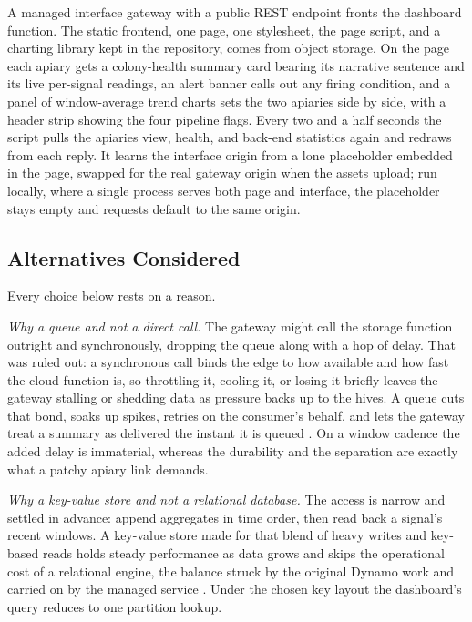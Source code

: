\documentclass[conference]{IEEEtran}
\begin{document}
A managed interface gateway with a public REST endpoint fronts the dashboard function. The static frontend, one page, one stylesheet, the page script, and a charting library kept in the repository, comes from object storage. On the page each apiary gets a colony-health summary card bearing its narrative sentence and its live per-signal readings, an alert banner calls out any firing condition, and a panel of window-average trend charts sets the two apiaries side by side, with a header strip showing the four pipeline flags. Every two and a half seconds the script pulls the apiaries view, health, and back-end statistics again and redraws from each reply. It learns the interface origin from a lone placeholder embedded in the page, swapped for the real gateway origin when the assets upload; run locally, where a single process serves both page and interface, the placeholder stays empty and requests default to the same origin.

\subsection{Alternatives Considered}

Every choice below rests on a reason.

\textit{Why a queue and not a direct call.} The gateway might call the storage function outright and synchronously, dropping the queue along with a hop of delay. That was ruled out: a synchronous call binds the edge to how available and how fast the cloud function is, so throttling it, cooling it, or losing it briefly leaves the gateway stalling or shedding data as pressure backs up to the hives. A queue cuts that bond, soaks up spikes, retries on the consumer's behalf, and lets the gateway treat a summary as delivered the instant it is queued \cite{hohpe2003}. On a window cadence the added delay is immaterial, whereas the durability and the separation are exactly what a patchy apiary link demands.

\textit{Why a key-value store and not a relational database.} The access is narrow and settled in advance: append aggregates in time order, then read back a signal's recent windows. A key-value store made for that blend of heavy writes and key-based reads holds steady performance as data grows and skips the operational cost of a relational engine, the balance struck by the original Dynamo work and carried on by the managed service \cite{decandia2007, elhemali2022}. Under the chosen key layout the dashboard's query reduces to one partition lookup.
\end{document}
